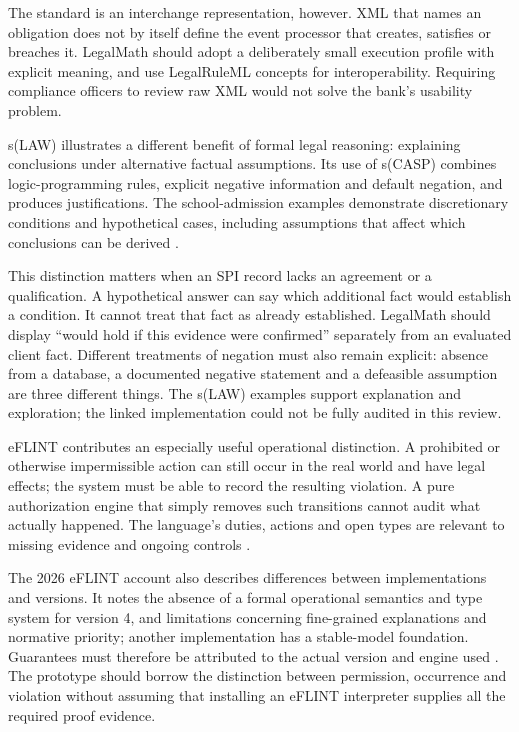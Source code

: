 The standard is an interchange representation, however. XML that names an
obligation does not by itself define the event processor that creates, satisfies
or breaches it. LegalMath should adopt a deliberately small execution profile
with explicit meaning, and use LegalRuleML concepts for interoperability. Requiring
compliance officers to review raw XML would not solve the bank's usability problem.

s(LAW) illustrates a different benefit of formal legal reasoning: explaining
conclusions under alternative factual assumptions. Its use of s(CASP) combines
logic-programming rules, explicit negative information and default negation, and
produces justifications. The school-admission examples demonstrate discretionary
conditions and hypothetical cases, including assumptions that affect which
conclusions can be derived \citep[secs.~4--5]{slaw2024}.

This distinction matters when an SPI record lacks an agreement or a qualification.
A hypothetical answer can say which additional fact would establish a condition.
It cannot treat that fact as already established. LegalMath should display
``would hold if this evidence were confirmed'' separately from an evaluated
client fact. Different treatments of negation must also remain explicit: absence
from a database, a documented negative statement and a defeasible assumption are
three different things. The s(LAW) examples support explanation and exploration;
the linked implementation could not be fully audited in this review.

eFLINT contributes an especially useful operational distinction. A prohibited or
otherwise impermissible action can still occur in the real world and have legal
effects; the system must be able to record the resulting violation. A pure
authorization engine that simply removes such transitions cannot audit what
actually happened. The language's duties, actions and open types are relevant
to missing evidence and ongoing controls \citep[secs.~3--5]{eflint2026}.

The 2026 eFLINT account also describes differences between implementations and
versions. It notes the absence of a formal operational semantics and type system
for version 4, and limitations concerning fine-grained explanations and normative
priority; another implementation has a stable-model foundation. Guarantees must
therefore be attributed to the actual version and engine used
\citep[secs.~6--7]{eflint2026}. The prototype should borrow the distinction between
permission, occurrence and violation without assuming that installing an eFLINT
interpreter supplies all the required proof evidence.

